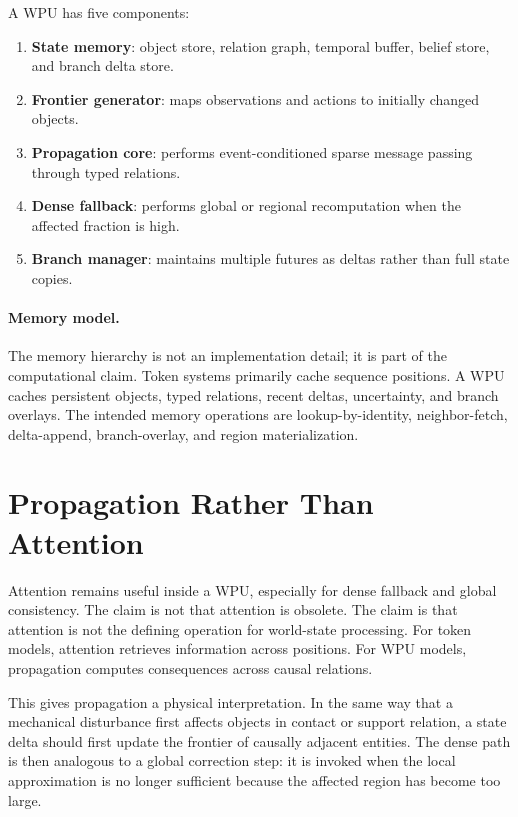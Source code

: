\documentclass[11pt]{article}
\begin{document}
A WPU has five components:

\begin{enumerate}[leftmargin=*]
\item \textbf{State memory}: object store, relation graph, temporal buffer,
belief store, and branch delta store.
\item \textbf{Frontier generator}: maps observations and actions to initially
changed objects.
\item \textbf{Propagation core}: performs event-conditioned sparse message
passing through typed relations.
\item \textbf{Dense fallback}: performs global or regional recomputation when
the affected fraction is high.
\item \textbf{Branch manager}: maintains multiple futures as deltas rather than
full state copies.
\end{enumerate}

\paragraph{Memory model.}
The memory hierarchy is not an implementation detail; it is part of the
computational claim. Token systems primarily cache sequence positions. A WPU
caches persistent objects, typed relations, recent deltas, uncertainty, and
branch overlays. The intended memory operations are lookup-by-identity,
neighbor-fetch, delta-append, branch-overlay, and region materialization.

\section{Propagation Rather Than Attention}

Attention remains useful inside a WPU, especially for dense fallback and global
consistency. The claim is not that attention is obsolete. The claim is that
attention is not the defining operation for world-state processing. For token
models, attention retrieves information across positions. For WPU models,
propagation computes consequences across causal relations.

This gives propagation a physical interpretation. In the same way that a
mechanical disturbance first affects objects in contact or support relation, a
state delta should first update the frontier of causally adjacent entities. The
dense path is then analogous to a global correction step: it is invoked when the
local approximation is no longer sufficient because the affected region has
become too large.
\end{document}
